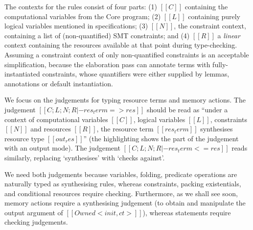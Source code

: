 \documentclass[11pt]{article}%
\begin{document}
The contexts for the rules consist of four parts: (1) $[[ C ]]$ containing the
computational variables from the Core program; (2) $[[ L ]]$ containing purely
logical variables mentioned in specifications; (3) $[[ N ]]$, the constraint
context, containing a list of (non-quantified) SMT constraints; and (4) $[[ R ]]$ a
\emph{linear} context containing the resources available at that point during
type-checking. Assuming a constraint context of only non-quantified constraints
is an acceptable simplification, because the elaboration pass can annotate terms
with fully-instantiated constraints, whose quantifiers were either supplied
by lemmas, annotations or default instantiation.

We focus on the judgements for typing resource terms and memory actions. The
judgement $[[ C ; L ; N ; R |- res_term => res ]]$ should be read as ``under a
context of computational variables $[[ C ]]$, logical variables $[[ L ]]$,
constraints $[[ N ]]$ and resources $[[ R ]]$, the resource term
$[[ res_term ]]$ synthesises resource type $[[ out_res ]]$'' (the highlighting shows the
part of the judgement with an \colorbox{red!10}{output mode}). The judgement
$[[ C ; L ; N ; R |- res_term <= res ]]$ reads similarly, replacing
`synthesises' with `checks against'.

We need both judgements because variables, folding, predicate operations are
naturally typed as synthesising rules, whereas constraints, packing
existentials, and conditional resources require checking.  Furthermore, as we
shall see soon, memory actions require a synthesising judgement (to obtain and
manipulate the output argument of $[[ Owned < init , ct > ]]$), whereas
statements require checking judgements.
\end{document}
